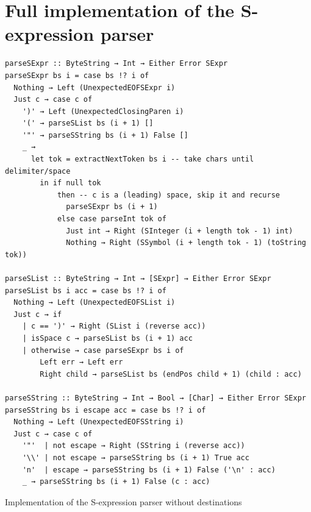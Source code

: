 \documentclass[english]{jflart}
\begin{document}
\appendix

\section{Full implementation of the S-expression parser}\label{ann:parse-s-expr}

\begin{table}[H]
\small
\begin{verbatim}
parseSExpr :: ByteString → Int → Either Error SExpr
parseSExpr bs i = case bs !? i of
  Nothing → Left (UnexpectedEOFSExpr i)
  Just c → case c of
    ')' → Left (UnexpectedClosingParen i)
    '(' → parseSList bs (i + 1) []
    '"' → parseSString bs (i + 1) False []
    _ →
      let tok = extractNextToken bs i -- take chars until delimiter/space
        in if null tok
            then -- c is a (leading) space, skip it and recurse
              parseSExpr bs (i + 1)
            else case parseInt tok of
              Just int → Right (SInteger (i + length tok - 1) int)
              Nothing → Right (SSymbol (i + length tok - 1) (toString tok))

parseSList :: ByteString → Int → [SExpr] → Either Error SExpr
parseSList bs i acc = case bs !? i of
  Nothing → Left (UnexpectedEOFSList i)
  Just c → if
    | c == ')' → Right (SList i (reverse acc))
    | isSpace c → parseSList bs (i + 1) acc
    | otherwise → case parseSExpr bs i of
        Left err → Left err
        Right child → parseSList bs (endPos child + 1) (child : acc)

parseSString :: ByteString → Int → Bool → [Char] → Either Error SExpr
parseSString bs i escape acc = case bs !? i of
  Nothing → Left (UnexpectedEOFSString i)
  Just c → case c of
    '"'  | not escape → Right (SString i (reverse acc))
    '\\' | not escape → parseSString bs (i + 1) True acc
    'n'  | escape → parseSString bs (i + 1) False ('\n' : acc)
    _ → parseSString bs (i + 1) False (c : acc)
\end{verbatim}
\caption{Implementation of the S-expression parser without destinations}
\label{table:impl-sexpr-parser-without-dest}
\end{table}
\end{document}
